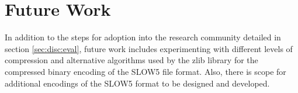 \section{Future Work}
\label{sec:future}

In addition to the steps for adoption into the research community detailed in section \ref{sec:disc:eval}, future work includes experimenting with different levels of compression and alternative algorithms used by the zlib library for the compressed binary encoding of the SLOW5 file format. Also, there is scope for additional encodings of the SLOW5 format to be designed and developed.
